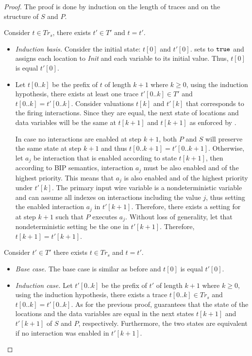 \begin{proof}
\label{proof:equi-correct}
%
The proof is done by induction on the length of traces and on the structure of $S$ and $P$.

Consider $t \in Tr_s$, there exists $t' \in T'$ and $t = t'$. 
\begin{itemize}
\item
\textit{Induction basis.}
Consider the initial state: $t[0]$ and $t'[0]$.  sets  to $\mathtt{true}$ and assigns each location to \textit{Init} and each variable to its initial value. Thus, $t[0]$ is equal $t'[0]$. 
\item
Let $t[0..k]$ be the prefix of $t$ of length $k+1$ where $k\ge 0$, using the induction hypothesis, there exists at least one trace 
  $t'[0..k] \in T'$ and $t[0..k]=t'[0..k]$. 
  Consider valuations $t[k]$ and $t'[k]$ that corresponds to the firing interactions.
  Since they are equal, the next state of locations
  and data variables will be the same at $t[k+1]$ and $t[k+1]$ as enforced by . 

  In case no interactions are enabled at step $k+1$, both $P$ and $S$ will preserve the same state at step $k+1$ and thus $t[0..k+1] =t'[0..k+1]$. 
  Otherwise, let $a_j$ be  interaction that is enabled according to state $t[k+1]$, 
  then according to BIP semantics, interaction $a_j$ must be also enabled and of the highest priority. 
  This means that $a_j$ is also enabled and of the highest priority under $t'[k]$. 
  The primary input  wire variable is a nondeterministic variable and can assume all indexes on interactions including the value 
  $j$, thus setting the enabled interaction $a_j$ in $t'[k+1]$. 
  Therefore, there exists a setting for  at step $k+1$ such that $P$ executes $a_j$. 
  Without loss of generality, let that nondeterministic setting be the one in $t'[k+1]$. 
  Therefore, $t[k+1] = t'[k+1]$. 
\end{itemize}
%
Consider $t' \in T'$ there exists $t \in Tr_s$ and $t = t'$.
%
\begin{itemize}
\item
\textit{Base case.}
The base case is similar as before and $t[0]$ is equal $t'[0]$.
\item
\textit{Induction case.}
Let $t'[0..k]$ be the prefix of $t'$ of length $k+1$ where $k\ge 0$, using the induction hypothesis, there exists a trace 
  $t[0..k] \in Tr_s$ and $t[0..k]=t'[0..k]$. 
  As for the previous proof,  guarantees that the state of the locations and the data variables are equal in the next states $t[k+1]$ and $t'[k+1]$ of $S$ and $P$, respectively. Furthermore, the two states are equivalent if no interaction was enabled in $t'[k+1]$. 


\end{itemize}
\end{proof}
